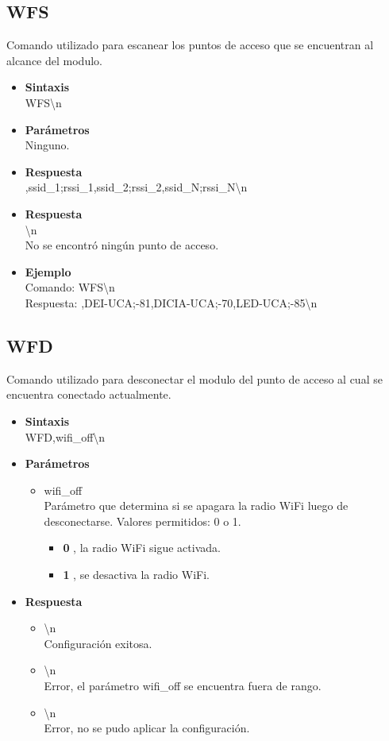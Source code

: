 \documentclass[a4paper,spanish]{article}
\begin{document}
\subsection{WFS}
Comando utilizado para escanear los puntos de acceso que se encuentran al alcance del modulo.
\begin{itemize}
	\item \textbf{Sintaxis}\\
	{\ttfamily WFS\textbackslash n}
	\item \textbf{Parámetros}\\
	Ninguno.
	\item \textbf{Respuesta}\\
	{,ssid\_1;rssi\_1,ssid\_2;rssi\_2,ssid\_N;rssi\_N\textbackslash n}
	\item \textbf{Respuesta}\\
	{\textbackslash n}\\
	No se encontró ningún punto de acceso.
	\item\textbf{Ejemplo}\\
	Comando: {\ttfamily WFS\textbackslash n}\\
	Respuesta: {,DEI-UCA;-81,DICIA-UCA;-70,LED-UCA;-85\textbackslash n}
\end{itemize}



\subsection{WFD}
Comando utilizado para desconectar el modulo del punto de acceso al cual se encuentra conectado actualmente. 
\begin{itemize}
	\item \textbf{Sintaxis}\\
	{\ttfamily WFD,wifi\_off\textbackslash n}
	\item \textbf{Parámetros}
	\begin{itemize}
		\item{\ttfamily wifi\_off}\\
		Parámetro que determina si se apagara la radio WiFi luego de desconectarse. Valores permitidos: 0 o 1.
		\begin{itemize}
			\item \textbf{0} , la radio WiFi sigue activada. 
			\item \textbf{1} , se desactiva la radio WiFi.
		\end{itemize}
	\end{itemize}
	\item \textbf{Respuesta}
	\begin{itemize}
		\item{\textbackslash n} \\
		Configuración exitosa.
		\item{\textbackslash n} \\
		Error, el parámetro {\ttfamily  wifi\_off} se encuentra fuera de rango.
		\item{\textbackslash n} \\
		Error, no se pudo aplicar la configuración.
	\end{itemize}
\end{itemize}
\end{document}
